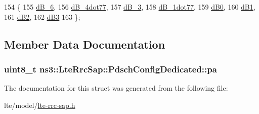 \begin{DoxyCode}
154     \{
155       \hyperlink{structns3_1_1LteRrcSap_1_1PdschConfigDedicated_ab578fcb68059ff534058eb5c67df7168a42399258b8b913f0a56c4e950354cbe3}{dB\_6},
156       \hyperlink{structns3_1_1LteRrcSap_1_1PdschConfigDedicated_ab578fcb68059ff534058eb5c67df7168ad1abcb4b289e226650368e4f93fe1fc8}{dB\_4dot77},
157       \hyperlink{structns3_1_1LteRrcSap_1_1PdschConfigDedicated_ab578fcb68059ff534058eb5c67df7168ad063207223326a9486eba1ce016865d9}{dB\_3},
158       \hyperlink{structns3_1_1LteRrcSap_1_1PdschConfigDedicated_ab578fcb68059ff534058eb5c67df7168a02259942327b99c5664d644aa58232a8}{dB\_1dot77},
159       \hyperlink{structns3_1_1LteRrcSap_1_1PdschConfigDedicated_ab578fcb68059ff534058eb5c67df7168ab2c88638c7d33e466151e88100a930d6}{dB0},
160       \hyperlink{structns3_1_1LteRrcSap_1_1PdschConfigDedicated_ab578fcb68059ff534058eb5c67df7168aa673d34261604d2117b2980842ca4cf4}{dB1},
161       \hyperlink{structns3_1_1LteRrcSap_1_1PdschConfigDedicated_ab578fcb68059ff534058eb5c67df7168abb102a537d21d1ba559d2eab80edc657}{dB2},
162       \hyperlink{structns3_1_1LteRrcSap_1_1PdschConfigDedicated_ab578fcb68059ff534058eb5c67df7168a72e02fab5b3134438e44150e2cf24c6e}{dB3}
163     \};
\end{DoxyCode}


\subsection{Member Data Documentation}
\subsubsection[{\texorpdfstring{pa}{pa}}]{\setlength{\rightskip}{0pt plus 5cm}uint8\+\_\+t ns3\+::\+Lte\+Rrc\+Sap\+::\+Pdsch\+Config\+Dedicated\+::pa}\hypertarget{structns3_1_1LteRrcSap_1_1PdschConfigDedicated_aa9b1574a63fb83c53649305ca95aeb31}{}\label{structns3_1_1LteRrcSap_1_1PdschConfigDedicated_aa9b1574a63fb83c53649305ca95aeb31}


The documentation for this struct was generated from the following file\+:\begin{DoxyCompactItemize}
\item 
lte/model/\hyperlink{lte-rrc-sap_8h}{lte-\/rrc-\/sap.\+h}\end{DoxyCompactItemize}
